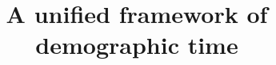 \documentclass{bmcart}
\theoremstyle{definition}
\begin{document}
\begin{frontmatter}

\begin{fmbox}


\title{A unified framework of demographic time}


\author[
]{}%




\end{fmbox}
\end{frontmatter}
\end{document}
